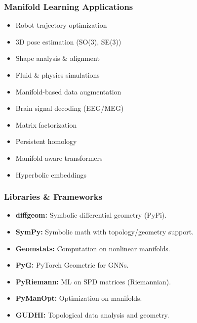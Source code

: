 \begin{frame}[fragile]\frametitle{Manifold Learning Applications}
  \small
    \begin{itemize}
      \item Robot trajectory optimization
      \item 3D pose estimation (SO(3), SE(3))
      \item Shape analysis \& alignment
      \item Fluid \& physics simulations
      \item Manifold-based data augmentation
      \item Brain signal decoding (EEG/MEG)
      \item Matrix factorization
      \item Persistent homology
      \item Manifold-aware transformers
      \item Hyperbolic embeddings
    \end{itemize}
\end{frame}

\begin{frame}[fragile]\frametitle{Libraries \& Frameworks}
  \begin{itemize}
    \item \textbf{diffgeom:} Symbolic differential geometry (PyPi).
    \item \textbf{SymPy:} Symbolic math with topology/geometry support.
    \item \textbf{Geomstats:} Computation on nonlinear manifolds.
    \item \textbf{PyG:} PyTorch Geometric for GNNs.
    \item \textbf{PyRiemann:} ML on SPD matrices (Riemannian).
    \item \textbf{PyManOpt:} Optimization on manifolds.
    \item \textbf{GUDHI:} Topological data analysis and geometry.
  \end{itemize}
\end{frame}





















